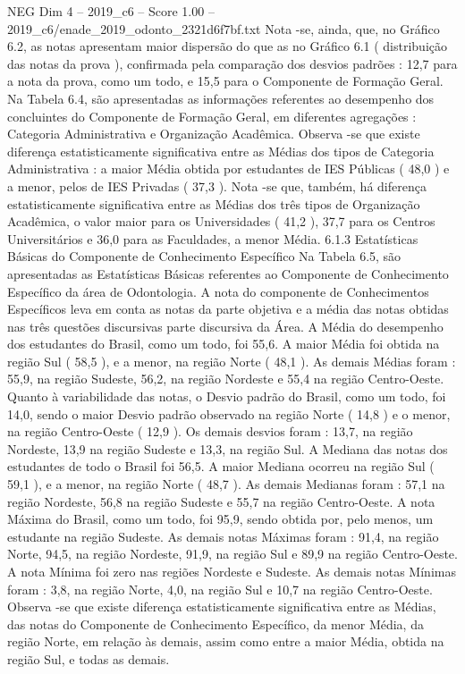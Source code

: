 \begin{textsample}{NEG Dim 4 – 2019\_c6 – Score 1.00 – 2019\_c6/enade\_2019\_odonto\_2321d6f7bf.txt}
Nota -se, ainda, que, no Gráfico 6.2, as notas apresentam maior dispersão do que as no Gráfico 6.1 ( distribuição das notas da prova ), confirmada pela comparação dos desvios padrões : 12,7 para a nota da prova, como um todo, e 15,5 para o Componente de Formação Geral.
Na Tabela 6.4, são apresentadas as informações referentes ao desempenho dos concluintes do Componente de Formação Geral, em diferentes agregações : Categoria Administrativa e Organização Acadêmica.
Observa -se que existe diferença estatisticamente significativa entre as Médias dos tipos de Categoria Administrativa : a maior Média obtida por estudantes de IES Públicas ( 48,0 ) e a menor, pelos de IES Privadas ( 37,3 ).
Nota -se que, também, há diferença estatisticamente significativa entre as Médias dos três tipos de Organização Acadêmica, o valor maior para os Universidades ( 41,2 ), 37,7 para os Centros Universitários e 36,0 para as Faculdades, a menor Média. 6.1.3 Estatísticas Básicas do Componente de Conhecimento Específico Na Tabela 6.5, são apresentadas as Estatísticas Básicas referentes ao Componente de Conhecimento Específico da área de Odontologia.
A nota do componente de Conhecimentos Específicos leva em conta as notas da parte objetiva e a média das notas obtidas nas três questões discursivas parte discursiva da Área.
A Média do desempenho dos estudantes do Brasil, como um todo, foi 55,6.
A maior Média foi obtida na região Sul ( 58,5 ), e a menor, na região Norte ( 48,1 ).
As demais Médias foram : 55,9, na região Sudeste, 56,2, na região Nordeste e 55,4 na região Centro-Oeste.
Quanto à variabilidade das notas, o Desvio padrão do Brasil, como um todo, foi 14,0, sendo o maior Desvio padrão observado na região Norte ( 14,8 ) e o menor, na região Centro-Oeste ( 12,9 ).
Os demais desvios foram : 13,7, na região Nordeste, 13,9 na região Sudeste e 13,3, na região Sul.
A Mediana das notas dos estudantes de todo o Brasil foi 56,5.
A maior Mediana ocorreu na região Sul ( 59,1 ), e a menor, na região Norte ( 48,7 ).
As demais Medianas foram : 57,1 na região Nordeste, 56,8 na região Sudeste e 55,7 na região Centro-Oeste.
A nota Máxima do Brasil, como um todo, foi 95,9, sendo obtida por, pelo menos, um estudante na região Sudeste.
As demais notas Máximas foram : 91,4, na região Norte, 94,5, na região Nordeste, 91,9, na região Sul e 89,9 na região Centro-Oeste.
A nota Mínima foi zero nas regiões Nordeste e Sudeste.
As demais notas Mínimas foram : 3,8, na região Norte, 4,0, na região Sul e 10,7 na região Centro-Oeste.
Observa -se que existe diferença estatisticamente significativa entre as Médias, das notas do Componente de Conhecimento Específico, da menor Média, da região Norte, em relação às demais, assim como entre a maior Média, obtida na região Sul, e todas as demais.

\end{textsample}
